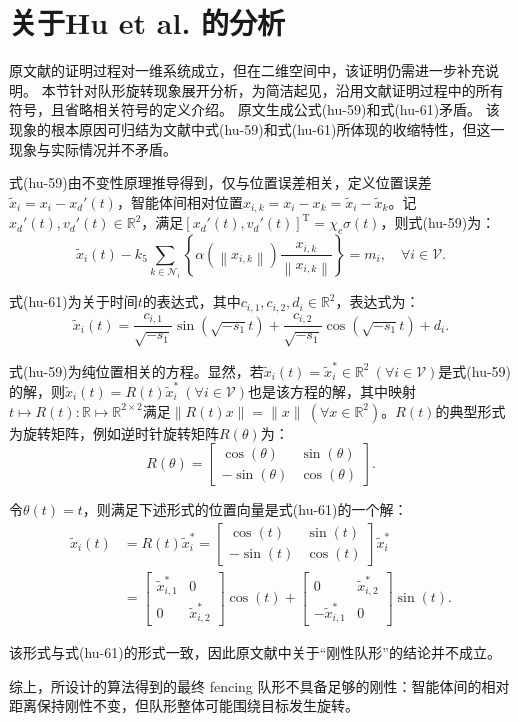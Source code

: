 
\section{关于Hu et al.\cite{huCooperativeLabelfreeMoving2023} 的分析}
原文献的证明过程对一维系统成立，但在二维空间中，该证明仍需进一步补充说明。
本节针对队形旋转现象展开分析，为简洁起见，沿用文献\cite{huCooperativeLabelfreeMoving2023}证明过程中的所有符号，且省略相关符号的定义介绍。
原文生成公式(hu-59)和式(hu-61)矛盾。
该现象的根本原因可归结为文献\cite{huCooperativeLabelfreeMoving2023}中式(hu-59)和式(hu-61)所体现的收缩特性，但这一现象与实际情况并不矛盾。

式(hu-59)由不变性原理推导得到，仅与位置误差相关，定义位置误差$\tilde{x}_{i}=x_{i}-x_{d}'(t)$，智能体间相对位置$x_{i,k}=x_{i}-x_{k}=\tilde{x}_{i}-\tilde{x}_{k}$。记$x_{d}'(t), v_{d}'(t) \in \mathbb{R}^{2}$，满足$[x_{d}'(t), v_{d}'(t)]^{\text{T}}=\chi_{c} \sigma(t)$，则式(hu-59)为：
\[
\tilde{x}_{i}(t)-k_{5} \sum_{k \in \mathcal{N}_{i}}\left\{\alpha\left(\left\| x_{i,k}\right\| \right) \frac{x_{i,k}}{\left\| x_{i,k}\right\| }\right\}=m_{i}, \quad \forall i \in \mathcal{V}.
\tag{hu-59}
\]

式(hu-61)为关于时间$t$的表达式，其中$c_{i,1}, c_{i,2}, d_{i} \in \mathbb{R}^{2}$，表达式为：
\[
\tilde{x}_{i}(t)=\frac{c_{i,1}}{\sqrt{-s_{1}}} \sin \left(\sqrt{-s_{1}} t\right)+\frac{c_{i,2}}{\sqrt{-s_{1}}} \cos \left(\sqrt{-s_{1}} t\right)+d_{i}.
\tag{hu-61}
\]

式(hu-59)为纯位置相关的方程。显然，若$\tilde{x}_{i}(t)=\tilde{x}_{i}^{*} \in \mathbb{R}^{2} \ (\forall i \in \mathcal{V})$是式(hu-59)的解，则$\tilde{x}_{i}(t)=R(t) \tilde{x}_{i}^{*} \ (\forall i \in \mathcal{V})$也是该方程的解，其中映射$t \mapsto R(t): \mathbb{R} \mapsto \mathbb{R}^{2 \times 2}$满足$\|R(t) x\|=\|x\| \ (\forall x \in \mathbb{R}^{2})$。$R(t)$的典型形式为旋转矩阵，例如逆时针旋转矩阵$R(\theta)$为：
\[
R(\theta )=\begin{bmatrix}
\cos (\theta ) & \sin (\theta )\\
-\sin (\theta ) & \cos (\theta )
\end{bmatrix}.
\]

令$\theta(t)=t$，则满足下述形式的位置向量是式(hu-61)的一个解：
\[
\begin{aligned}
\tilde{x}_{i}(t) & =R(t) \tilde{x}_{i}^{*}=\begin{bmatrix}
\cos (t) & \sin (t) \\
-\sin (t) & \cos (t)
\end{bmatrix} \tilde{x}_{i}^{*} \\
& =\begin{bmatrix}
\tilde{x}_{i,1}^{*} & 0 \\
0 & \tilde{x}_{i,2}^{*}
\end{bmatrix} \cos (t)+\begin{bmatrix}
0 & \tilde{x}_{i,2}^{*} \\
-\tilde{x}_{i,1}^{*} & 0
\end{bmatrix} \sin (t).
\end{aligned}
\]

该形式与式(hu-61)的形式一致，因此原文献中关于``刚性队形''的结论并不成立。

综上，所设计的算法得到的最终 fencing 队形不具备足够的刚性：智能体间的相对距离保持刚性不变，但队形整体可能围绕目标发生旋转。